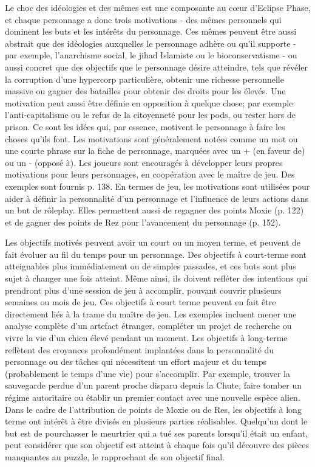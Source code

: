 Le choc des idéologies et des mêmes est une composante au cœur d'Eclipse Phase, et chaque personnage a donc trois motivations - des mêmes personnels qui dominent les buts et les intérêts du personnage. Ces mêmes peuvent être aussi abstrait que des idéologies auxquelles le personnage adhère ou qu'il supporte - par exemple, l'anarchisme social, le jihad Islamiste ou le bioconservatisme - ou aussi concret que des objectifs que le personnage désire atteindre, tels que révéler la corruption d'une hypercorp particulière, obtenir une richesse personnelle massive ou gagner des batailles pour obtenir  des droits pour les élevés. Une motivation peut aussi être définie en opposition à quelque chose; par exemple l'anti-capitalisme ou le refus de la citoyenneté pour les pods, ou rester hors de prison. Ce sont les idées qui, par essence, motivent le personnage à faire les choses qu'ils font. Les motivations sont généralement notées comme un mot ou une courte phrase sur la fiche de personnage, marquées avec un + (en faveur de) ou un - (opposé à). Les joueurs sont encouragés à développer leurs propres motivations pour leurs personnages, en coopération avec le maître de jeu. Des exemples sont fournis p. 138. En termes de jeu, les motivations sont utilisées pour aider à définir la personnalité d'un personnage et l'influence de leurs actions dans un but de rôleplay. Elles permettent aussi de regagner des points Moxie (p. 122) et de gagner des points de Rez pour l'avancement du personnage (p. 152). 

Les objectifs motivés peuvent avoir un court ou un moyen terme, et peuvent de fait évoluer au fil du temps pour un personnage. Des objectifs à court-terme sont atteignables plus immédiatement ou de simples passades, et ces buts sont plus sujet à changer une fois atteint. Même ainsi, ils doivent refléter des intentions qui prendront plus d'une session de jeu à accomplir, pouvant couvrir plusieurs semaines ou mois de jeu. Ces objectifs à court terme peuvent en fait être directement liés à la trame du maître de jeu. Les exemples incluent mener une analyse complète d'un artefact étranger, compléter un projet de recherche ou vivre la vie d'un chien élevé pendant un moment. Les objectifs à long-terme reflètent des croyances profondément implantées dans la personnalité du personnage ou des tâches qui nécessitent un effort majeur et du temps (probablement le temps d'une vie) pour s'accomplir. Par exemple, trouver la sauvegarde perdue d'un parent proche disparu depuis la Chute, faire tomber un régime autoritaire ou établir un premier contact avec une nouvelle espèce alien. Dans le cadre de l'attribution de points de Moxie ou de Res, les objectifs à long terme ont intérêt à être divisés en plusieurs parties réalisables. Quelqu'un dont le but est de pourchasser le meurtrier qui a tué ses parents lorsqu'il était un enfant, peut considérer que son objectif est atteint à chaque fois qu'il découvre des pièces manquantes au puzzle, le rapprochant de son objectif final. 

